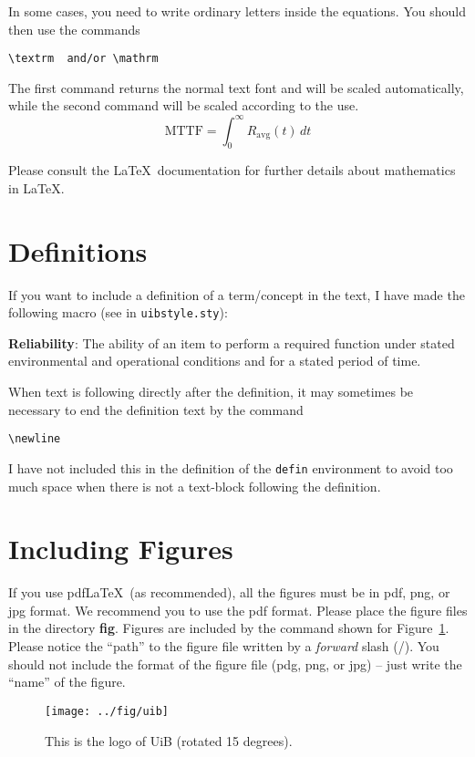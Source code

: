 \documentclass[../Main/thesis.tex]{subfiles}
\begin{document}
In some cases, you need to write ordinary letters inside the equations. 
You should then use the commands 
\begin{verbatim}
\textrm  and/or \mathrm
\end{verbatim}
The first command returns the normal text font and will be scaled automatically, while the second command will be scaled according to the use.
\begin{equation*}
\textrm{MTTF}= \int_0^\infty R_\mathrm{avg}(t)\,dt
\end{equation*}



Please consult the \LaTeX\ documentation for further details about mathematics in \LaTeX.
\section*{Definitions}
\label{sec:definitions}
If you want to include a definition of a term/concept in the text, I have made the following macro (see in \texttt{uibstyle.sty}):
\begin{defin}
\textbf{Reliability}: The ability of an item to perform a required function under stated environmental and operational conditions and for a stated period of time.\newline
\end{defin}
When text is following directly after the definition, it may sometimes be necessary to end the definition text by the command
\begin{verbatim}
\newline
\end{verbatim}
I have not included this in the definition of the \texttt{defin} environment to avoid too much space when there is not a text-block following the definition.
\section{Including Figures}
\label{sec:including_figures}
If you use pdf\LaTeX\ (as recommended), all the figures must be in pdf, png, or jpg format. 
We recommend you to use the pdf format.  
Please place the figure files in the directory \textbf{fig}. 
Figures are included by the command shown for Figure~\ref{fig:uib_logo_rotated}. 
Please notice the ``path'' to the figure file written by a \emph{forward} slash (/). 
You should not include the format of the figure file (pdg, png, or jpg) -- just write the ``name'' of the figure. 
\begin{figure}
\centering
\texttt{[image: ../fig/uib]}
\caption{This is the logo of UiB (rotated 15 degrees).}
\label{fig:uib_logo_rotated}
\end{figure}
\end{document}
